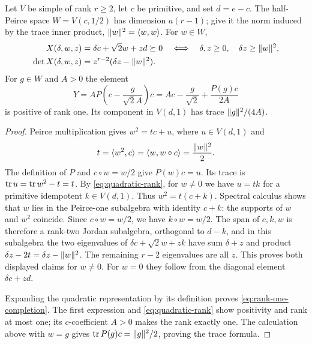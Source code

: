 \begin{lemma}\label{lem:perspective}
Let $V$ be simple of rank $r\geq2$, let $c$ be primitive, and set $d=e-c$.
The half-Peirce space $W=V(c,1/2)$ has dimension $a(r-1)$; give it the
norm induced by the trace inner product, $\lVert w\rVert^2=\langle w,w\rangle$. For $w\in W$,
\begin{align}
 X(\delta,w,z)&=\delta c+\sqrt2 w+zd\succeq0
   \quad\Longleftrightarrow\quad
   \delta,z\geq0,\quad\delta z\geq\lVert w\rVert^2,
       \label{eq:perspective-positive}\\
 \det X(\delta,w,z)&=z^{r-2}(\delta z-\lVert w\rVert^2).
       \label{eq:perspective-det}
\end{align}
For $g\in W$ and $A>0$ the element
\begin{equation}\label{eq:rank-one-completion}
 Y=A P\left(c-\frac{g}{\sqrt2 A}\right)c
   =Ac-\frac{g}{\sqrt2}+\frac{P(g)c}{2A}
\end{equation}
is positive of rank one. Its component in $V(d,1)$ has trace
$\lVert g\rVert^2/(4A)$.
\end{lemma}
\begin{proof}
Peirce multiplication gives $w^2=tc+u$, where $u\in V(d,1)$ and
\[
 t=\langle w^2,c\rangle=\langle w,w\circ c\rangle=\frac{\lVert w\rVert^2}{2}.
\]
The definition of $P$ and $c\circ w=w/2$ give $P(w)c=u$.
Its trace is $\operatorname{tr} u=\operatorname{tr} w^2-t=t$. By
\eqref{eq:quadratic-rank}, for $w\ne0$ we have $u=tk$ for a primitive
idempotent $k\in V(d,1)$. Thus $w^2=t(c+k)$. Spectral calculus shows
that $w$ lies in the Peirce-one subalgebra with identity $c+k$:
the supports of $w$ and $w^2$ coincide. Since $c\circ w=w/2$,
we have $k\circ w=w/2$. The span of $c,k,w$ is therefore a rank-two
Jordan subalgebra, orthogonal to $d-k$, and in this subalgebra the two
eigenvalues of $\delta c+\sqrt2 w+zk$ have sum $\delta+z$ and product
$\delta z-2t=\delta z-\lVert w\rVert^2$.
The remaining $r-2$ eigenvalues are all $z$. This proves both displayed
claims for $w\ne0$. For $w=0$ they follow from the diagonal element
$\delta c+zd$.

Expanding the quadratic representation by its definition proves
\eqref{eq:rank-one-completion}. The first expression and
\eqref{eq:quadratic-rank} show positivity and rank at most one; its
$c$-coefficient $A>0$ makes the rank exactly one. The calculation above
with $w=g$ gives $\operatorname{tr} P(g)c=\lVert g\rVert^2/2$, proving the trace formula.
\end{proof}

